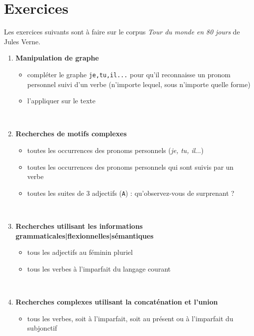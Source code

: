 \documentclass[xcolor={table,usenames,dvipsnames}]{article}
\begin{document}
\section{Exercices}
	Les exercices suivants sont à faire sur le corpus \textit{Tour du monde en 80 jours} de Jules Verne.
\begin{enumerate}
	\item \textbf{Manipulation de graphe}
	\begin{itemize}
		\item compléter le graphe \texttt{je,tu,il...} pour qu'il reconnaisse un pronom personnel suivi d'un verbe (n'importe lequel, sous n'importe quelle forme)
		\item l'appliquer sur le texte
	\end{itemize}
	\\
	\bigskip
	
\item \textbf{Recherches de motifs complexes}
	\begin{itemize}
		\item toutes les occurrences des pronoms personnels (\textit{je, tu, il$\dots$})
		\item toutes les occurrences des pronoms personnels qui sont suivis par un verbe
		\item toutes les suites de 3 adjectifs (\texttt{A}) : qu'observez-vous de surprenant ?
	\end{itemize}
	\\
	\bigskip
	
	\item \textbf{Recherches utilisant les informations grammaticales|flexionnelles|sémantiques}
	\begin{itemize}
		\item tous les adjectifs au féminin pluriel
		\item tous les verbes à l'imparfait du langage courant
	\end{itemize}
	
		\\
	\bigskip
	
	\item \textbf{Recherches complexes utilisant la concaténation et l'union}
	\begin{itemize}
		\item tous les verbes, soit à l'imparfait, soit au présent ou à l'imparfait du subjonctif
	\end{itemize}
	\\
	\bigskip


\end{enumerate}
\end{document}
